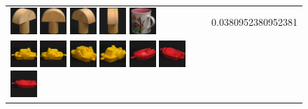 {\begin{figure}[p]
\begin{tabular}{m{11cm} | m{3cm} |}
\includegraphics[width=1cm]{coil/beeld-3.eps}
\includegraphics[width=1cm]{coil/beeld-1.eps}
\includegraphics[width=1cm]{coil/beeld-4.eps}
\includegraphics[width=1cm]{coil/beeld-2.eps}
\includegraphics[width=1cm]{coil/beeld-10.eps}
& {\scriptsize 0.0380952380952381}
\\
\includegraphics[width=1cm]{coil/beeld-12.eps}
\includegraphics[width=1cm]{coil/beeld-13.eps}
\includegraphics[width=1cm]{coil/beeld-16.eps}
\includegraphics[width=1cm]{coil/beeld-15.eps}
\includegraphics[width=1cm]{coil/beeld-21.eps}
\includegraphics[width=1cm]{coil/beeld-22.eps}
\includegraphics[width=1cm]{coil/beeld-18.eps}

\end{tabular}
\end{figure}}
